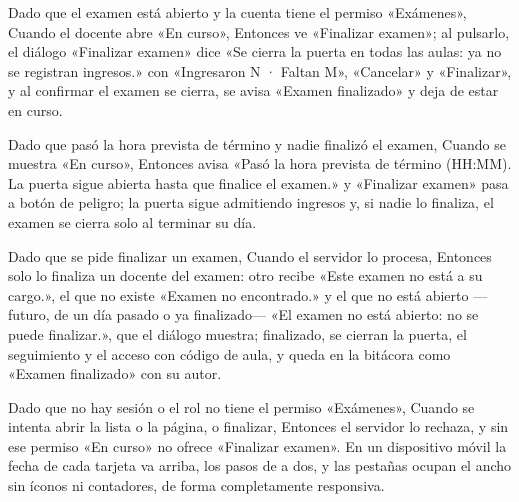 {\item Dado que el examen está abierto y la cuenta tiene el permiso «Exámenes», Cuando el
      docente abre «En curso», Entonces ve «Finalizar examen»; al pulsarlo, el diálogo
      «Finalizar examen» dice «Se cierra la puerta en todas las aulas: ya no se
      registran ingresos.» con «Ingresaron N · Faltan M», «Cancelar» y «Finalizar», y al
      confirmar el examen se cierra, se avisa «Examen finalizado» y deja de estar en
      curso.
\item Dado que pasó la hora prevista de término y nadie finalizó el examen, Cuando se
      muestra «En curso», Entonces avisa «Pasó la hora prevista de término (HH:MM). La
      puerta sigue abierta hasta que finalice el examen.» y «Finalizar examen» pasa a
      botón de peligro; la puerta sigue admitiendo ingresos y, si nadie lo finaliza, el
      examen se cierra solo al terminar su día.
\item Dado que se pide finalizar un examen, Cuando el servidor lo procesa, Entonces solo
      lo finaliza un docente del examen: otro recibe «Este examen no está a su cargo.»,
      el que no existe «Examen no encontrado.» y el que no está abierto ---futuro, de un
      día pasado o ya finalizado--- «El examen no está abierto: no se puede finalizar.»,
      que el diálogo muestra; finalizado, se cierran la puerta, el seguimiento y el
      acceso con código de aula, y queda en la bitácora como «Examen finalizado» con su
      autor.
\item Dado que no hay sesión o el rol no tiene el permiso «Exámenes», Cuando se intenta
      abrir la lista o la página, o finalizar, Entonces el servidor lo rechaza, y sin
      ese permiso «En curso» no ofrece «Finalizar examen». En un dispositivo móvil la
      fecha de cada tarjeta va arriba, los pasos de a dos, y las pestañas ocupan el
      ancho sin íconos ni contadores, de forma completamente responsiva.}

\def\HUMockupsPares{%
\CajaMockup{hu28-examenes}{10.6cm} & \CajaMockup{hu28-examenes-movil}{3.2cm} \\[4pt]
\hline
\CajaMockup{hu28-nuevo-examen}{10.6cm} & \CajaMockup{hu28-nuevo-examen-movil}{3.2cm} \\[4pt]
\hline
\CajaMockup{hu28-elegir-aulas}{10.6cm} & \CajaMockup{hu28-elegir-aulas-movil}{3.2cm} \\[4pt]
\hline
\CajaMockup{hu28-finalizar-examen}{10.6cm} & \CajaMockup{hu28-finalizar-examen-movil}{3.2cm} \\[4pt]
\hline}


